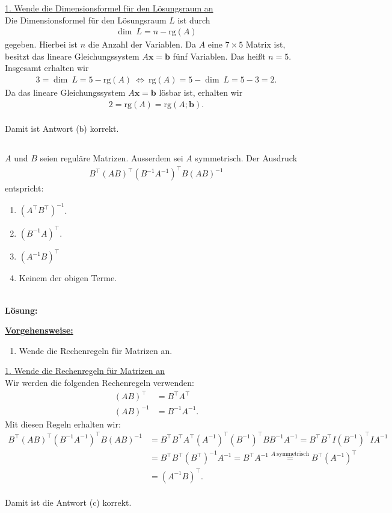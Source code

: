 \underline{1. Wende die Dimensionsformel für den Lösungsraum an}\\
Die Dimensionsformel für den Lösungsraum $ L $ ist durch 
\begin{align*}
\dim \ L = n - \mathrm{rg}(A )
\end{align*}
gegeben. 
Hierbei ist $ n $ die Anzahl der Variablen.
Da $ A $ eine $ 7 \times 5 $ Matrix ist, besitzt das lineare Gleichungssystem
$ A \textbf{x} = \textbf{b} $ fünf Variablen.
Das heißt $ n = 5 $.
Insgesamt erhalten wir
\begin{align*}
3 = \dim \ L = 5 - \mathrm{rg}(A)
\ \Leftrightarrow \
\mathrm{rg}(A) = 5 - \dim \ L = 5 -3 = 2.
\end{align*}
Da das lineare Gleichungssystem $ A \textbf{x} = \textbf{b} $ lösbar ist, erhalten wir
\begin{align*}
2=\mathrm{rg}(A)= \mathrm{rg}(A;\textbf{b} ).
\end{align*}
\ \\
Damit ist Antwort (b) korrekt.
\newpage
\subsection*{}
$ A $ und $ B $ seien reguläre Matrizen. Ausserdem sei $ A $ symmetrisch.
Der Ausdruck
\begin{align*}
B^\top (AB)^\top (B^{-1} A^{-1})^\top B (AB)^{-1}
\end{align*}
entspricht:
\begin{enumerate}
	\item 
	$ (A^\top B^\top)^{-1} $.
	\item
	$ (B^{-1} A)^\top $.
	
	\item
	$ (A^{-1} B )^\top $
	\item
	Keinem der obigen Terme.
\end{enumerate}
\ \\
\textbf{Lösung:}
\begin{mdframed}
	\underline{\textbf{Vorgehensweise:}}
	\renewcommand{\labelenumi}{\theenumi.}
	\begin{enumerate}
		\item Wende die Rechenregeln für Matrizen an.
	\end{enumerate}
\end{mdframed}

\underline{1. Wende die Rechenregeln für Matrizen an}\\
Wir werden die folgenden Rechenregeln verwenden:
\begin{align*}
(A B)^\top &= B^\top A^\top\\
(A B)^{-1} &= B^{-1} A^{-1}.
\end{align*}
Mit diesen Regeln erhalten wir:
\begin{align*}
B^\top (AB)^\top (B^{-1} A^{-1})^\top B (AB)^{-1}
&=
B^\top B^\top A^\top (A^{-1})^\top (B^{-1})^\top B B^{-1} A^{-1}
=
B^\top B^\top I (B^{-1})^\top I A^{-1}\\
&=
B^\top B^\top  (B^\top)^{-1}  A^{-1}
=
B^\top  A^{-1}
\overset{A \ \textrm{symmetrisch}}{=}
B^\top (A^{-1})^\top\\
&=
(A^{-1} B)^\top.
\end{align*}
\ \\
Damit ist die Antwort (c) korrekt.